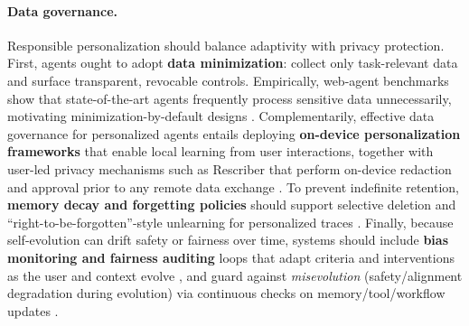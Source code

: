 \paragraph{Data governance.}
Responsible personalization should balance adaptivity with privacy protection. First, agents ought to adopt \textbf{data minimization}: collect only task-relevant data and surface transparent, revocable controls. Empirically, web-agent benchmarks show that state-of-the-art agents frequently process sensitive data unnecessarily, motivating minimization-by-default designs \citep{zharmagambetov2025agentdam}. Complementarily, effective data governance for personalized agents entails deploying \textbf{on-device personalization frameworks} that enable local learning from user interactions, together with user-led privacy mechanisms such as Rescriber that perform on-device redaction and approval prior to any remote data exchange \citep{zhou2025rescriber}. To prevent indefinite retention, \textbf{memory decay and forgetting policies} should support selective deletion and “right-to-be-forgotten”-style unlearning for personalized traces \citep{staufer2025should}. Finally, because self-evolution can drift safety or fairness over time, systems should include \textbf{bias monitoring and fairness auditing} loops that adapt criteria and interventions as the user and context evolve \citep{basu2025fair}, and guard against \emph{misevolution} (safety/alignment degradation during evolution) via continuous checks on memory/tool/workflow updates \citep{shao2025misevolution}.


